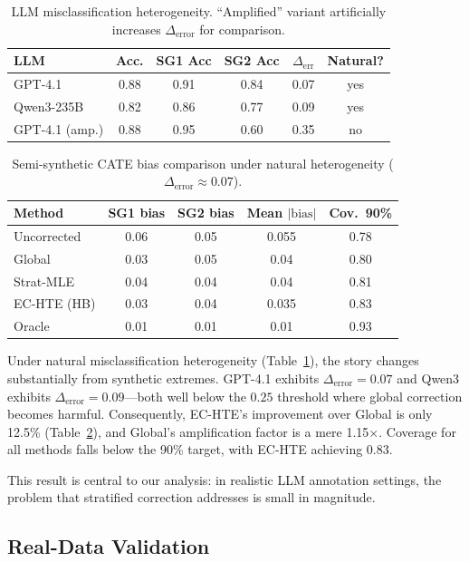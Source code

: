 \documentclass[11pt,a4paper]{article}
\begin{document}
\begin{table}[t]
\centering
\small
\caption{LLM misclassification heterogeneity. ``Amplified'' variant artificially increases $\Delta_{\text{error}}$ for comparison.}
\label{tab:llm_het}
\begin{tabular}{@{}lccccc@{}}
\toprule
LLM & Acc. & SG1 Acc & SG2 Acc & $\Delta_{\text{err}}$ & Natural? \\
\midrule
GPT-4.1 & 0.88 & 0.91 & 0.84 & 0.07 & yes \\
Qwen3-235B & 0.82 & 0.86 & 0.77 & 0.09 & yes \\
GPT-4.1 (amp.) & 0.88 & 0.95 & 0.60 & 0.35 & no \\
\bottomrule
\end{tabular}
\end{table}

\begin{table}[t]
\centering
\small
\caption{Semi-synthetic CATE bias comparison under natural heterogeneity ($\Delta_{\text{error}} \approx 0.07$).}
\label{tab:semisyn}
\begin{tabular}{@{}lcccc@{}}
\toprule
Method & SG1 bias & SG2 bias & Mean $|\text{bias}|$ & Cov.\ 90\% \\
\midrule
Uncorrected & 0.06 & 0.05 & 0.055 & 0.78 \\
Global & 0.03 & 0.05 & 0.04 & 0.80 \\
Strat-MLE & 0.04 & 0.04 & 0.04 & 0.81 \\
EC-HTE (HB) & 0.03 & 0.04 & 0.035 & 0.83 \\
Oracle & 0.01 & 0.01 & 0.01 & 0.93 \\
\bottomrule
\end{tabular}
\end{table}

Under natural misclassification heterogeneity (Table~\ref{tab:llm_het}), the story changes substantially from synthetic extremes. GPT-4.1 exhibits $\Delta_{\text{error}} = 0.07$ and Qwen3 exhibits $\Delta_{\text{error}} = 0.09$---both well below the $0.25$ threshold where global correction becomes harmful. Consequently, EC-HTE's improvement over Global is only 12.5\% (Table~\ref{tab:semisyn}), and Global's amplification factor is a mere 1.15$\times$. Coverage for all methods falls below the 90\% target, with EC-HTE achieving 0.83.

This result is central to our analysis: in realistic LLM annotation settings, the problem that stratified correction addresses is small in magnitude.

\subsection{Real-Data Validation}
\label{sec:realdata}
\end{document}
